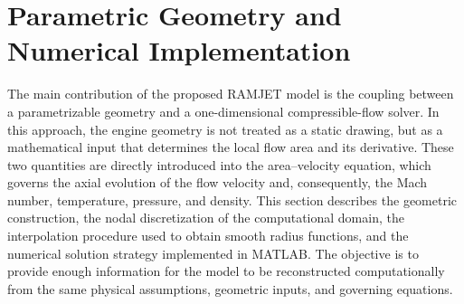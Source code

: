\documentclass[preprint,12pt]{elsarticle}
\begin{document}
\section{Parametric Geometry and Numerical Implementation}
\label{sec:numerical_implementation}
The main contribution of the proposed RAMJET model is the coupling between a parametrizable geometry and a one-dimensional compressible-flow solver. In this approach, the engine geometry is not treated as a static drawing, but as a mathematical input that determines the local flow area and its derivative. These two quantities are directly introduced into the area--velocity equation, which governs the axial evolution of the flow velocity and, consequently, the Mach number, temperature, pressure, and density.
This section describes the geometric construction, the nodal discretization of the computational domain, the interpolation procedure used to obtain smooth radius functions, and the numerical solution strategy implemented in MATLAB. The objective is to provide enough information for the model to be reconstructed computationally from the same physical assumptions, geometric inputs, and governing equations.
\end{document}
